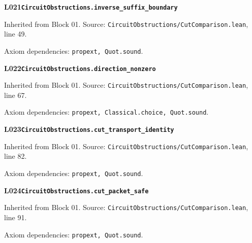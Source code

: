 \begin{minipage}{\linewidth}
\hypertarget{L021}{}
{\small\sffamily\bfseries\color{ink}L021\quad\nolinkurl{CircuitObstructions.inverse_suffix_boundary}}\par
{\scriptsize\sffamily\color{muted}Inherited from Block 01. Source: \nolinkurl{CircuitObstructions/CutComparison.lean}, line 49.}\par
{}
{\scriptsize\sffamily\color{muted}Axiom dependencies: \nolinkurl{propext, Quot.sound}.}
\end{minipage}\par\medskip
{}\par\medskip
\begin{minipage}{\linewidth}
\hypertarget{L022}{}
{\small\sffamily\bfseries\color{ink}L022\quad\nolinkurl{CircuitObstructions.direction_nonzero}}\par
{\scriptsize\sffamily\color{muted}Inherited from Block 01. Source: \nolinkurl{CircuitObstructions/CutComparison.lean}, line 67.}\par
{}
{\scriptsize\sffamily\color{muted}Axiom dependencies: \nolinkurl{propext, Classical.choice, Quot.sound}.}
\end{minipage}\par\medskip
\begin{minipage}{\linewidth}
\hypertarget{L023}{}
{\small\sffamily\bfseries\color{ink}L023\quad\nolinkurl{CircuitObstructions.cut_transport_identity}}\par
{\scriptsize\sffamily\color{muted}Inherited from Block 01. Source: \nolinkurl{CircuitObstructions/CutComparison.lean}, line 82.}\par
{}
{\scriptsize\sffamily\color{muted}Axiom dependencies: \nolinkurl{propext, Quot.sound}.}
\end{minipage}\par\medskip
\begin{minipage}{\linewidth}
\hypertarget{L024}{}
{\small\sffamily\bfseries\color{ink}L024\quad\nolinkurl{CircuitObstructions.cut_packet_safe}}\par
{\scriptsize\sffamily\color{muted}Inherited from Block 01. Source: \nolinkurl{CircuitObstructions/CutComparison.lean}, line 91.}\par
{}
{\scriptsize\sffamily\color{muted}Axiom dependencies: \nolinkurl{propext, Quot.sound}.}
\end{minipage}\par\medskip
